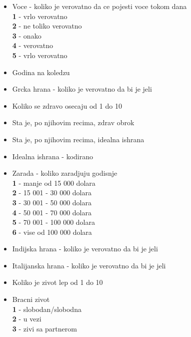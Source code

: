 \documentclass[12pt,a4paper]{article}
\begin{document}
\begin{itemize}
  \item Voce - koliko je verovatno da ce pojesti voce tokom dana\\
    \textbf{1} - vrlo verovatno\\
    \textbf{2} - ne toliko verovatno\\
    \textbf{3} - onako\\
    \textbf{4} - verovatno\\
    \textbf{5} - vrlo verovatno\\
  \item Godina na koledzu\\
  \item Grcka hrana - koliko je verovatno da bi je jeli\\
  \item Koliko se zdravo osecaju od 1 do 10\\
  \item Sta je, po njihovim recima, zdrav obrok\\
  \item Sta je, po njihovim recima, idealna ishrana\\
  \item Idealna ishrana - kodirano\\
  \item Zarada - koliko zaradjuju godisnje\\
    \textbf{1} - manje od 15 000 dolara\\
    \textbf{2} - 15 001 - 30 000 dolara\\
    \textbf{3} - 30 001 - 50 000 dolara\\
    \textbf{4} - 50 001 - 70 000 dolara\\
    \textbf{5} - 70 001 - 100 000 dolara\\
    \textbf{6} - vise od 100 000 dolara\\
  \item Indijska hrana - koliko je verovatno da bi je jeli\\
  \item Italijanska hrana - koliko je verovatno da bi je jeli\\
  \item Koliko je zivot lep od 1 do 10\\
  \item Bracni zivot\\
    \textbf{1} - slobodan/slobodna\\
    \textbf{2} - u vezi\\
    \textbf{3} - zivi sa partnerom\\

\end{itemize}
\end{document}
